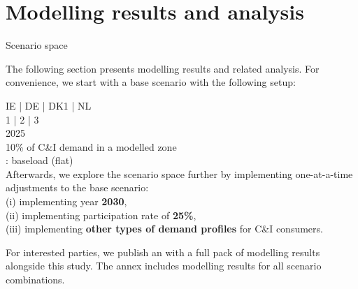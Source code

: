 \section{Modelling results and analysis}



\begin{frame}{Scenario space}

  {\small
  The following section presents modelling results and related analysis. 
  For convenience, we start with a \alert{base scenario} 
  with the following setup:

     IE | DE | DK1 | NL \\
     1 | 2 | 3 \\
     2025 \\ 
     10\% of C\&I demand in a modelled zone \\
    : baseload (flat) \\
  
  \vspace{0.3cm}
  Afterwards, we explore the scenario space further by implementing one-at-a-time 
  adjustments to the base scenario: \\
  (i) implementing year {\bf 2030}, \\
  (ii) implementing participation rate of {\bf 25\%}, \\ 
  (iii) implementing {\bf other types of demand profiles} for C\&I consumers.
  
  \vspace{0.3cm}
  For interested parties, we publish an  
  with a full pack of modelling results alongside this study. The annex 
  includes modelling results for all scenario combinations.
  }
  \end{frame}



